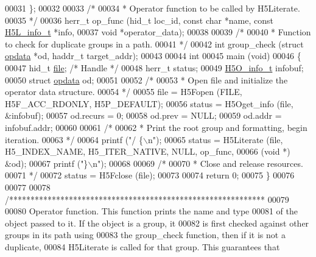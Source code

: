 \begin{DoxyCode}
00031 \};
00032 
00033 \textcolor{comment}{/*}
00034 \textcolor{comment}{ * Operator function to be called by H5Literate.}
00035 \textcolor{comment}{ */}
00036 herr\_t op\_func (hid\_t loc\_id, \textcolor{keyword}{const} \textcolor{keywordtype}{char} *name, \textcolor{keyword}{const} \hyperlink{struct_h5_l__info__t}{H5L\_info\_t} *info,
00037             \textcolor{keywordtype}{void} *operator\_data);
00038 
00039 \textcolor{comment}{/*}
00040 \textcolor{comment}{ * Function to check for duplicate groups in a path.}
00041 \textcolor{comment}{ */}
00042 \textcolor{keywordtype}{int} group\_check (\textcolor{keyword}{struct} \hyperlink{structopdata}{opdata} *od, haddr\_t target\_addr);
00043 
00044 \textcolor{keywordtype}{int}
00045 main (\textcolor{keywordtype}{void})
00046 \{
00047     hid\_t           \hyperlink{structfile}{file};           \textcolor{comment}{/* Handle */}
00048     herr\_t          status;
00049     \hyperlink{struct_h5_o__info__t}{H5O\_info\_t}      infobuf;
00050     \textcolor{keyword}{struct }\hyperlink{structopdata}{opdata}   od;
00051 
00052     \textcolor{comment}{/*}
00053 \textcolor{comment}{     * Open file and initialize the operator data structure.}
00054 \textcolor{comment}{     */}
00055     file = H5Fopen (FILE, H5F\_ACC\_RDONLY, H5P\_DEFAULT);
00056     status = H5Oget\_info (file, &infobuf);
00057     od.recurs = 0;
00058     od.prev = NULL;
00059     od.addr = infobuf.addr;
00060 
00061     \textcolor{comment}{/*}
00062 \textcolor{comment}{     * Print the root group and formatting, begin iteration.}
00063 \textcolor{comment}{     */}
00064     printf (\textcolor{stringliteral}{"/ \{\(\backslash\)n"});
00065     status = H5Literate (file, H5\_INDEX\_NAME, H5\_ITER\_NATIVE, NULL, op\_func,
00066                 (\textcolor{keywordtype}{void} *) &od);
00067     printf (\textcolor{stringliteral}{"\}\(\backslash\)n"});
00068 
00069     \textcolor{comment}{/*}
00070 \textcolor{comment}{     * Close and release resources.}
00071 \textcolor{comment}{     */}
00072     status = H5Fclose (file);
00073 
00074     \textcolor{keywordflow}{return} 0;
00075 \}
00076 
00077 
00078 \textcolor{comment}{/************************************************************}
00079 \textcolor{comment}{}
00080 \textcolor{comment}{  Operator function.  This function prints the name and type}
00081 \textcolor{comment}{  of the object passed to it.  If the object is a group, it}
00082 \textcolor{comment}{  is first checked against other groups in its path using}
00083 \textcolor{comment}{  the group\_check function, then if it is not a duplicate,}
00084 \textcolor{comment}{  H5Literate is called for that group.  This guarantees that}

\end{DoxyCode}
